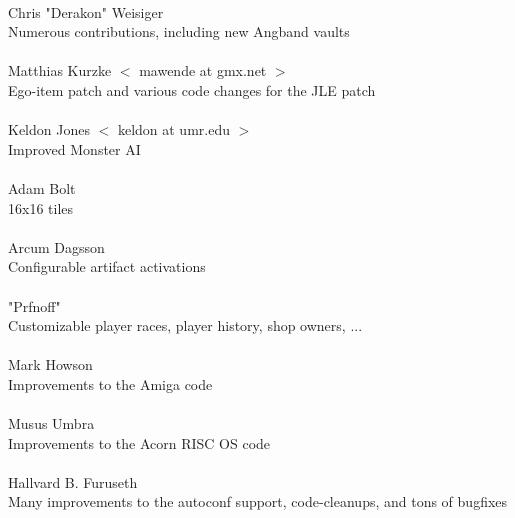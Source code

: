 \paragraph{}
Chris "Derakon" Weisiger \\
Numerous contributions, including new Angband vaults

\paragraph{}
Matthias Kurzke $<$ mawende at gmx.net $>$ \\
Ego-item patch and various code changes for the JLE patch

\paragraph{}
Keldon Jones $<$ keldon at umr.edu $>$ \\
Improved Monster AI

\paragraph{}
Adam Bolt \\
16x16 tiles

\paragraph{}
Arcum Dagsson \\
Configurable artifact activations

\paragraph{}
"Prfnoff" \\
Customizable player races, player history, shop owners, ...

\paragraph{}
Mark Howson \\
Improvements to the Amiga code

\paragraph{}
Musus Umbra \\
Improvements to the Acorn RISC OS code

\paragraph{}
Hallvard B. Furuseth \\
Many improvements to the autoconf support, code-cleanups, and tons of
bugfixes

